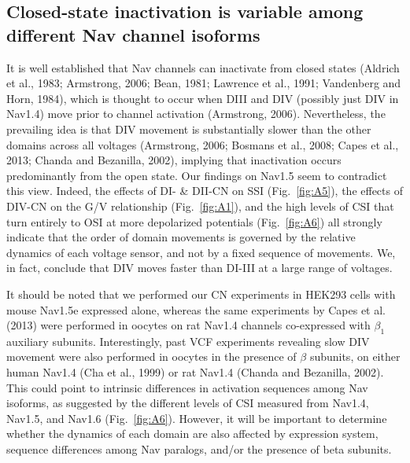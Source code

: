 \subsection{Closed-state inactivation is variable among different Nav channel isoforms}
It is well established that Nav channels can inactivate from closed states (Aldrich et al., 1983; Armstrong, 2006; Bean, 1981; Lawrence et al., 1991; Vandenberg and Horn, 1984), which is thought to occur when DIII and DIV (possibly just DIV in Nav1.4) move prior to channel activation (Armstrong, 2006). Nevertheless, the prevailing idea is that DIV movement is substantially slower than the other domains across all voltages (Armstrong, 2006; Bosmans et al., 2008; Capes et al., 2013; Chanda and Bezanilla, 2002), implying that inactivation occurs predominantly from the open state. Our findings on Nav1.5 seem to contradict this view. Indeed, the effects of DI- \& DII-CN on SSI (Fig.~\ref{fig:A5}), the effects of DIV-CN on the G/V relationship (Fig.~\ref{fig:A1}), and the high levels of CSI that turn entirely to OSI at more depolarized potentials (Fig.~\ref{fig:A6}) all strongly indicate that the order of domain movements is governed by the relative dynamics of each voltage sensor, and not by a fixed sequence of movements. We, in fact, conclude that DIV moves faster than DI-III at a large range of voltages.

It should be noted that we performed our CN experiments in HEK293 cells with mouse Nav1.5e expressed alone, whereas the same experiments by Capes et al. (2013) were performed in oocytes on rat Nav1.4 channels co-expressed with $\beta_1$ auxiliary subunits. Interestingly, past VCF experiments revealing slow DIV movement were also performed in oocytes in the presence of $\beta$ subunits, on either human Nav1.4 (Cha et al., 1999) or rat Nav1.4 (Chanda and Bezanilla, 2002). This could point to intrinsic differences in activation sequences among Nav isoforms, as suggested by the different levels of CSI measured from Nav1.4, Nav1.5, and Nav1.6 (Fig.~\ref{fig:A6}). However, it will be important to determine whether the dynamics of each domain are also affected by expression system, sequence differences among Nav paralogs, and/or the presence of beta subunits. 

